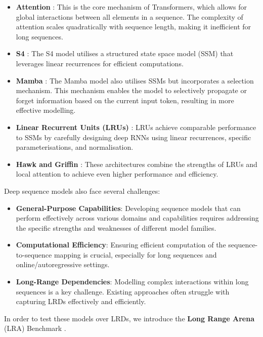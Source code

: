 \documentclass[12pt,a4paper]{report}
\begin{document}
\begin{itemize}
    \item \textbf{Attention} \cite{transformers}: This is the core mechanism of Transformers, which allows for global interactions between all elements in a sequence. The complexity of attention scales quadratically with sequence length, making it inefficient for long sequences.
    \item \textbf{S4} \cite{s4}: The S4 model utilises a structured state space model (SSM) that leverages linear recurrences for efficient computations.
    \item \textbf{Mamba} \cite{mamba}: The Mamba model also utilises SSMs but incorporates a selection mechanism. This mechanism enables the model to selectively propagate or forget information based on the current input token, resulting in more effective modelling.
    \item \textbf{Linear Recurrent Units (LRUs)} \cite{lru}: LRUs achieve comparable performance to SSMs by carefully designing deep RNNs using linear recurrences, specific parameterisations, and normalisation.
    \item \textbf{Hawk and Griffin} \cite{hawkgriffin}: These architectures combine the strengths of LRUs and local attention to achieve even higher performance and efficiency.
\end{itemize}

Deep sequence models also face several challenges:
\begin{itemize}
    \item \textbf{General-Purpose Capabilities}: Developing sequence models that can perform effectively across various domains and capabilities requires addressing the specific strengths and weaknesses of different model families.
    \item \textbf{Computational Efficiency}: Ensuring efficient computation of the sequence-to-sequence mapping is crucial, especially for long sequences and online/autoregressive settings.
    \item \textbf{Long-Range Dependencies}: Modelling complex interactions within long sequences is a key challenge. Existing approaches often struggle with capturing LRDs effectively and efficiently.
\end{itemize}

In order to test these models over LRDs, we introduce the \textbf{Long Range Arena} (LRA) Benchmark \cite{lra}.
\end{document}
